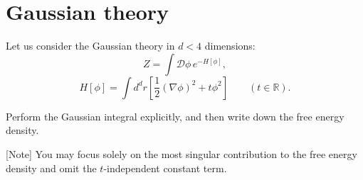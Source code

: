 \documentclass[11pt,a4paper]{article}
\newcounter{problem}
\begin{document}
	\section{Gaussian theory}
	
	Let us consider the Gaussian theory in $d < 4$ dimensions:
	\begin{equation}
		Z = \int \mathcal{D}\phi\, e^{-H[\phi]},
	\end{equation}
	\begin{equation}
		H[\phi] = \int d^d r\left[\frac{1}{2}(\nabla\phi)^2 + t\phi^2\right]\qquad (t\in\mathbb{R}).
	\end{equation}
	
	\begin{problembox}
		Perform the Gaussian integral explicitly, and then write down the free energy density.
		
		[Note] You may focus solely on the most singular contribution to the free energy density and omit the $t$-independent constant term.
	\end{problembox}
\end{document}
